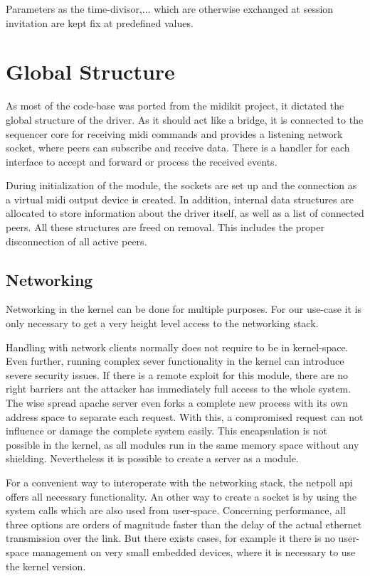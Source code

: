 \documentclass[paper=a4,fontsize=11pt,pagesize,bibtotoc]{scrartcl}
\begin{document}
	Parameters as the time-divisor,...
	which are otherwise exchanged at session invitation are kept fix at predefined values.
	
	\section{Global Structure}
	
	As most of the code-base was ported from the midikit project, it dictated the global structure of the driver. As it should act like a bridge, it is connected to the sequencer core for receiving midi commands and provides a listening network socket, where peers can subscribe and receive data. There is a handler for each interface to accept and forward or process the received events.
	
	During initialization of the module, the sockets are set up and the connection as a virtual midi output device is created. In addition, internal data structures are allocated to store information about the driver itself, as well as a list of connected peers. All these structures are freed on removal. This includes the proper disconnection of all active peers.
	
	\subsection{Networking}
	
	Networking in the kernel can be done for multiple purposes. For our use-case it is only necessary to get a very height level access to the networking stack. 
	
	Handling with network clients normally does not require to be in kernel-space. Even further, running complex sever functionality in the kernel can introduce severe security issues. If there is a remote exploit for this module, there are no right barriers ant the attacker has immediately full access to the whole system. The wise spread apache server even forks a complete new process with its own address space to separate each request. With this, a compromised request can not influence or damage the complete system easily.
	This encapsulation is not possible in the kernel, as all modules run in the same memory space without any shielding. Nevertheless it is possible to create a server as a module.
	
	For a convenient way to interoperate with the networking stack, the netpoll api offers all necessary functionality. An other way to create a socket is by using the system calls which are also used from user-space. Concerning performance, all three options are orders of magnitude faster than the delay of the actual ethernet transmission over the link. But there exists cases, for example it there is no user-space management on very small embedded devices, where it is necessary to use the kernel version.
	
	
	
	
	
\end{document}
